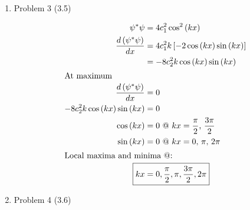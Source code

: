 \documentclass[12pt]{article}
\begin{document}
\begin{enumerate}
    \begin{align*}
        \psi &= e^{-bx^2} \\
        \int_{-\infty}^{\infty} \psi^*\psi dx &= \int_{-\infty}^{\infty} e^{-2bx^2} dx \\
        &= 2 \cdot \int_{0}^{\infty} e^{-2bx^2} dx \\
        \int_{0}^{\infty} e^{-2bx^2} dx &= \frac{1}{2} \sqrt{\frac{\pi}{2b}} \\
        \int_{-\infty}^{\infty} \psi^*\psi dx &= \sqrt{\frac{\pi}{2b}} \\
        \psi_{\text{norm}} &= c e^{-bx^2} \\
        c^2 \int_{-\infty}^{\infty} e^{-2bx^2} dx &= 1 \\
        c^2 &= \frac{1}{\int_{-\infty}^{\infty} e^{-2bx^2} dx} \\
        c^2 &= \frac{1}{\sqrt{\frac{\pi}{2b}}} \\
        c &= \left(\frac{2b}{\pi}\right)^{1/4} \\
        \Aboxed{\psi_{\text{norm}} &= \left(\frac{2b}{\pi}\right)^{1/4} e^{-bx^2}}
    \end{align*}

    \newpage
    \item Problem 3 (3.5)
    
    \begin{align*}
        \psi^*\psi &= 4 c_1^2 \cos^2 \left(kx\right) \\
        \frac{d\left(\psi^*\psi\right)}{dx} &= 4 c_1^2 k \left[-2 \cos\left(kx\right) \sin\left(kx\right)\right] \\
        &= -8 c_2^2 k \cos\left(kx\right) \sin\left(kx\right) \\
        \intertext{At maximum}
        \frac{d\left(\psi^*\psi\right)}{dx} &= 0 \\
        -8 c_2^2 k \cos\left(kx\right) \sin\left(kx\right) &= 0 \\
        \cos\left(kx\right) &= 0 \text{ @ $kx=\frac{\pi}{2}$, $\frac{3\pi}{2}$} \\
        \sin\left(kx\right) &= 0 \text{ @ $kx=0$, $\pi$, $2\pi$} \\
        \intertext{Local maxima and minima @:}
        \Aboxed{kx &= 0, \frac{\pi}{2}, \pi, \frac{3\pi}{2}, 2\pi}
    \end{align*}
    
    \newpage
    \item Problem 4 (3.6)
    

\end{enumerate}
\end{document}
